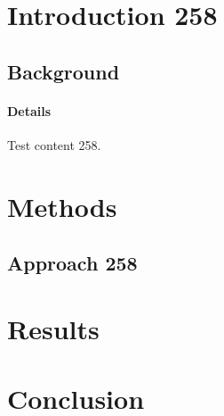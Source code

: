 \documentclass{article}
\begin{document}
\section{Introduction 258}
\subsection{Background}
\paragraph{Details} Test content 258.
\section{Methods}
\subsection{Approach 258}
\section{Results}
\section{Conclusion}
\end{document}
